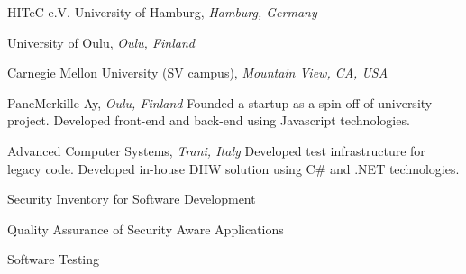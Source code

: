 \documentclass[9pt]{article}
\begin{document}
\noindent HITeC e.V. \amper{} University of Hamburg, \emph{Hamburg, Germany} \vspace{0.01in} 
\newline{}
\bigskip

\noindent University of Oulu, \emph{Oulu, Finland} \vspace{0.01in} 
\newline{}
\bigskip

\noindent Carnegie Mellon University (SV campus), \emph{Mountain View, CA, USA} \vspace{0.01in}  
\newline{}
\bigskip

\noindent PaneMerkille Ay, \emph{Oulu, Finland} \vspace{0.01in} 
\newline{}
\newline\noindent Founded a startup as a spin-off of university project.
\newline\noindent Developed front-end and back-end using Javascript technologies.
\bigskip

\noindent Advanced Computer Systems, \emph{Trani, Italy} \vspace{0.01in} 
\newline{}
\newline\noindent Developed test infrastructure for legacy code.
\newline\noindent Developed in-house DHW solution using C\# and .NET technologies.
\bigskip

  
\newline\noindent Security Inventory for Software Development
\bigskip

  
\newline\noindent Quality Assurance of Security Aware Applications
\bigskip

  
\newline\noindent Software Testing
\bigskip
\end{document}
